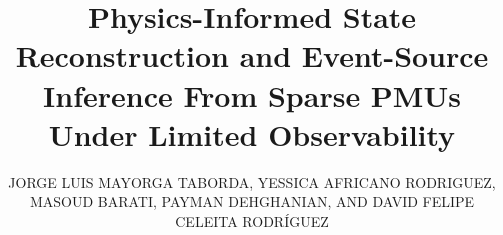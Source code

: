 \history{}
\doi{}

\title{Physics-Informed State Reconstruction and Event-Source Inference From Sparse PMUs Under Limited Observability}
\author{\uppercase{Jorge Luis Mayorga Taborda}, \uppercase{Yessica Africano Rodriguez}, \uppercase{Masoud Barati}, \uppercase{Payman Dehghanian}, AND \uppercase{David Felipe Celeita Rodr\'iguez}}

\address[1]{Universidad de los Andes, Bogot\'a, Colombia}
\address[2]{Department of Electrical and Computer Engineering, University of Pittsburgh, Pittsburgh, PA, USA}
\address[3]{Department of Electrical and Computer Engineering, The George Washington University, Washington, DC, USA}
\address[4]{Faculty of Engineering, Universidad de La Sabana, Ch\'ia, Colombia}

